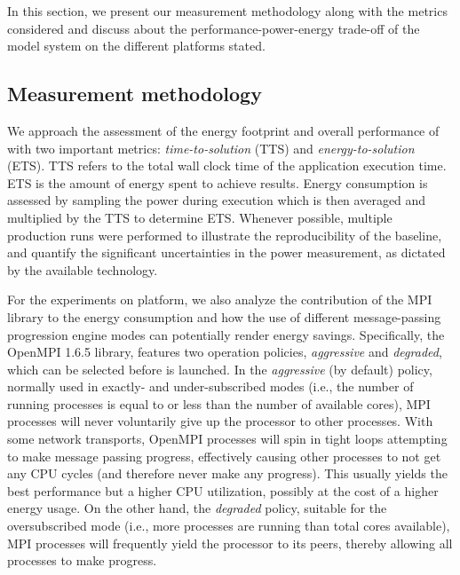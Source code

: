 In this section, we present our measurement methodology along with the
metrics  considered  and  discuss about  the  performance-power-energy
trade-off of the model system on the different platforms stated.

\subsection{Measurement methodology}
\label{subsec:4.1}

We  approach  the  assessment  of  the energy  footprint  and  overall
performance    of    \cosmoart    with    two    important    metrics:
\textit{time-to-solution} (TTS) and \textit{energy-to-solution} (ETS).
TTS refers to  the total wall clock time  of the application execution
time. ETS  is the amount of  energy spent to  achieve results.  Energy
consumption is  assessed by sampling the power  during execution which
is then averaged and multiplied  by the TTS to determine ETS. Whenever
possible, multiple  production runs  were performed to  illustrate the
reproducibility  of   the  baseline,  and   quantify  the  significant
uncertainties in  the power measurement, as dictated  by the available
technology.

For  the   experiments  on  \tinto  platform,  we   also  analyze  the
contribution of the MPI library  to the energy consumption and how the
use  of different message-passing progression engine 
modes can potentially  render energy  savings. Specifically,   the  OpenMPI 1.6.5  library,  features  two  operation 
policies, \emph{aggressive} and \emph{degraded}, which can be  selected 
before \cosmoart is launched. In the \emph{aggressive} (by default) policy,  
normally used in exactly- and under-subscribed modes  (i.e., the  number 
of running processes is equal to or less than the number of  available 
cores), MPI processes will never voluntarily give up the processor  to 
other processes. With some network transports, OpenMPI processes  will 
spin  in  tight  loops  attempting  to  make message passing progress, 
effectively causing other processes to not get  any  CPU  cycles  (and  
therefore never make any  progress).  This  usually  yields  the  best 
performance but a higher CPU utilization, possibly at the cost of a higher 
energy usage.  On the other hand, the \emph{degraded} policy, suitable 
for the oversubscribed mode (i.e., more  processes  are  running  than 
total cores  available),  MPI  processes  will  frequently  yield  the 
processor to its peers, thereby allowing all processes to make progress. 

